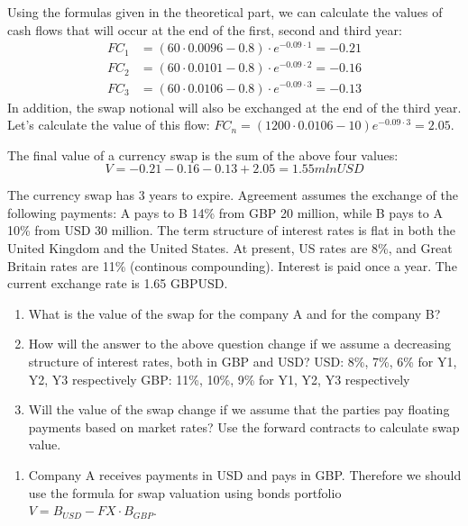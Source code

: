 \documentclass[12pt,a4paper]{exam}
\begin{document}
\begin{questions}
\begin{solution}
Using the formulas given in the theoretical part, we can calculate the values of cash flows that will occur at the end of the first, second and third year:
\begin{equation*}
\begin{aligned}
FC_1&=(60\cdot0.0096-0.8)\cdot e^{-0.09\cdot1}=-0.21 \\
FC_2&=(60\cdot0.0101-0.8)\cdot e^{-0.09\cdot2}=-0.16 \\
FC_3&=(60\cdot0.0106-0.8)\cdot e^{-0.09\cdot3}=-0.13
\end{aligned}
\end{equation*}
In addition, the swap notional will also be exchanged at the end of the third year. Let’s calculate the value of this flow: $FC_n=(1200\cdot 0.0106-10)e^{-0.09\cdot3}=2.05$.

The final value of a currency swap is the sum of the above four values:
\begin{equation*}
V=-0.21-0.16-0.13+2.05=1.55 mln USD
\end{equation*}
\end{solution}

\question The currency swap has 3 years to expire. Agreement assumes the exchange of the following payments: A pays to B 14\% from GBP 20 million, while B pays to A 10\% from USD 30 million. The term structure of interest rates is flat in both the United Kingdom and the United States. At present, US rates are 8\%, and Great Britain rates are 11\% (continous compounding). Interest is paid once a year. The current exchange rate is 1.65 GBPUSD.
\begin{enumerate}[label=(\alph*),font=\itshape]
\item What is the value of the swap for the company A and for the company B?
\item How will the answer to the above question change if we assume a decreasing structure of interest rates, both in GBP and USD?
USD: 8\%, 7\%, 6\% for Y1, Y2, Y3 respectively
GBP: 11\%, 10\%, 9\% for Y1, Y2, Y3 respectively
\item Will the value of the swap change if we assume that the parties pay floating payments based on market rates? Use the forward contracts to calculate swap value.
\end{enumerate}
\begin{solution}
\begin{enumerate}[label=(\alph*),font=\itshape]
\item Company A receives payments in USD and pays in GBP. Therefore we should use the formula for swap valuation using bonds portfolio $V= B_{USD}-FX\cdot B_{GBP}$.


\end{enumerate}
\end{solution}
\end{questions}
\end{document}
